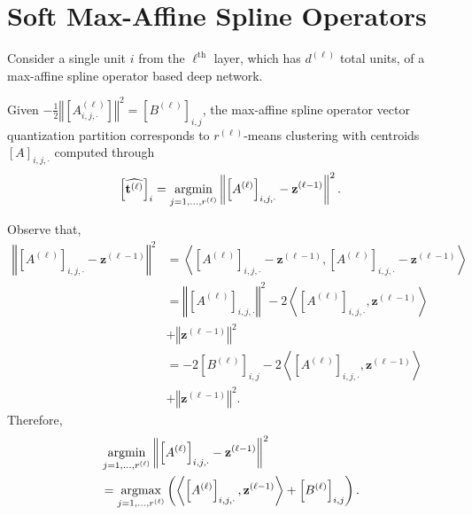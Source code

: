 \section{Soft Max-Affine Spline Operators}\label{sec:smaso}

Consider a single unit $i$ from the $\ell^{\text{th}}$ layer, which has $d^{(\ell)}$ total units, of a max-affine spline operator based deep network.

\begin{proposition}\label{prop:maso_vq_is_kmeans}
    Given $-\frac{1}{2}\left\Vert\left[A^{(\ell)}_{i,j,\cdot}\right]\right\Vert^2=\left[B^{(\ell)}\right]_{i,j}$, the max-affine spline operator vector quantization partition corresponds to $r^{(\ell)}$-means clustering with centroids $\left[A\right]_{i,j,\cdot}$ computed through $$\left[\widehat{\mathbf{t}^{(\ell)}}\right]_i=\operatorname*{\mathrm{argmin}}_{j=1,\dots,r^{(\ell)}}\left\Vert\left[A^{(\ell)}\right]_{i,j,\cdot}-\mathbf{z}^{(\ell-1)}\right\Vert^2.$$
\end{proposition}

\begin{tproof}
    Observe that,
    \begin{align*}
        \left\Vert\left[A^{(\ell)}\right]_{i,j,\cdot}-\mathbf{z}^{(\ell-1)}\right\Vert^2&=\left\langle\left[A^{(\ell)}\right]_{i,j,\cdot}-\mathbf{z}^{(\ell-1)},\left[A^{(\ell)}\right]_{i,j,\cdot}-\mathbf{z}^{(\ell-1)}\right\rangle\\&=\left\Vert\left[A^{(\ell)}\right]_{i,j,\cdot}\right\Vert^2-2\left\langle\left[A^{(\ell)}\right]_{i,j,\cdot},\mathbf{z}^{(\ell-1)}\right\rangle\\&+\left\Vert\mathbf{z}^{(\ell-1)}\right\Vert^2\\&=-2\left[B^{(\ell)}\right]_{i,j}-2\left\langle\left[A^{(\ell)}\right]_{i,j,\cdot},\mathbf{z}^{(\ell-1)}\right\rangle\\&+\left\Vert\mathbf{z}^{(\ell-1)}\right\Vert^2.
    \end{align*}
    Therefore, 
    \begin{align*}
        &\operatorname*{\mathrm{argmin}}_{j=1,\dots,r^{(\ell)}}\left\Vert\left[A^{(\ell)}\right]_{i,j,\cdot}-\mathbf{z}^{(\ell-1)}\right\Vert^2\\&=\operatorname*{\mathrm{argmax}}_{j=1,\dots,r^{(\ell)}}\left(\left\langle\left[A^{(\ell)}\right]_{i,j,\cdot},\mathbf{z}^{(\ell-1)}\right\rangle+\left[B^{(\ell)}\right]_{i,j}\right).
    \end{align*}
\end{tproof}

